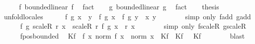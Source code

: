 \begin{isabellebody}
%
\isadelimproof
%
\endisadelimproof
%
\isatagproof
{}\isamarkupfalse%
\ {\isacharminus}{\kern0pt}\isanewline
\ \ \isamarkupfalse%
\ f{\isacharcolon}{\kern0pt}\ bounded{\isacharunderscore}{\kern0pt}linear\ f\ \isamarkupfalse%
\ fact\isanewline
\ \ \isamarkupfalse%
\ g{\isacharcolon}{\kern0pt}\ bounded{\isacharunderscore}{\kern0pt}linear\ g\ \isamarkupfalse%
\ fact\isanewline
\ \ \isamarkupfalse%
\ {\isacharquery}{\kern0pt}thesis\isanewline
\ \ \isamarkupfalse%
\ unfold{\isacharunderscore}{\kern0pt}locales\isanewline
\ \ \ \ \isamarkupfalse%
\ {\isachardoublequoteopen}f\ {\isacharparenleft}{\kern0pt}g\ {\isacharparenleft}{\kern0pt}x\ {\isacharplus}{\kern0pt}\ y{\isacharparenright}{\kern0pt}{\isacharparenright}{\kern0pt}\ {\isacharequal}{\kern0pt}\ f\ {\isacharparenleft}{\kern0pt}g\ x{\isacharparenright}{\kern0pt}\ {\isacharplus}{\kern0pt}\ f\ {\isacharparenleft}{\kern0pt}g\ y{\isacharparenright}{\kern0pt}{\isachardoublequoteclose}\ \ x\ y\isanewline
\ \ \ \ \ \ \isamarkupfalse%
\ {\isacharparenleft}{\kern0pt}simp\ only{\isacharcolon}{\kern0pt}\ f{\isachardot}{\kern0pt}add\ g{\isachardot}{\kern0pt}add{\isacharparenright}{\kern0pt}\isanewline
\ \ \ \ \isamarkupfalse%
\ {\isachardoublequoteopen}f\ {\isacharparenleft}{\kern0pt}g\ {\isacharparenleft}{\kern0pt}scaleR\ r\ x{\isacharparenright}{\kern0pt}{\isacharparenright}{\kern0pt}\ {\isacharequal}{\kern0pt}\ scaleR\ r\ {\isacharparenleft}{\kern0pt}f\ {\isacharparenleft}{\kern0pt}g\ x{\isacharparenright}{\kern0pt}{\isacharparenright}{\kern0pt}{\isachardoublequoteclose}\ \ r\ x\isanewline
\ \ \ \ \ \ \isamarkupfalse%
\ {\isacharparenleft}{\kern0pt}simp\ only{\isacharcolon}{\kern0pt}\ f{\isachardot}{\kern0pt}scaleR\ g{\isachardot}{\kern0pt}scaleR{\isacharparenright}{\kern0pt}\isanewline
\ \ \ \ \isamarkupfalse%
\ f{\isachardot}{\kern0pt}pos{\isacharunderscore}{\kern0pt}bounded\ \isamarkupfalse%
\ Kf\ \ f{\isacharcolon}{\kern0pt}\ {\isachardoublequoteopen}{\isasymAnd}x{\isachardot}{\kern0pt}\ norm\ {\isacharparenleft}{\kern0pt}f\ x{\isacharparenright}{\kern0pt}\ {\isasymle}\ norm\ x\ {\isacharasterisk}{\kern0pt}\ Kf{\isachardoublequoteclose}\ \ Kf{\isacharcolon}{\kern0pt}\ {\isachardoublequoteopen}{}\ {\isacharless}{\kern0pt}\ Kf{\isachardoublequoteclose}\isanewline
\ \ \ \ \ \ \isamarkupfalse%
\ blast\isanewline

\end{isabellebody}

